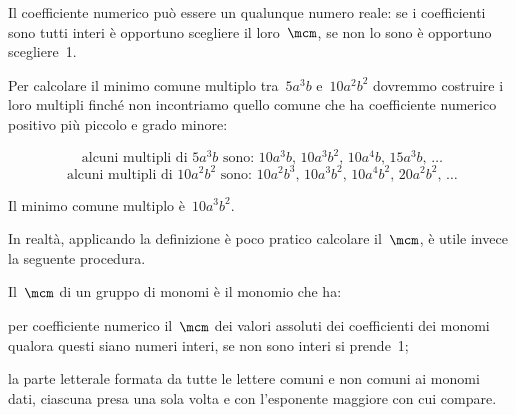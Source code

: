 Il coefficiente numerico può essere un qualunque numero reale: se i
coefficienti sono tutti interi è opportuno scegliere il loro~$\mcm$,
se non lo sono è opportuno scegliere~1.

\begin{exrig}
 \begin{esempio}
Per calcolare il minimo comune multiplo tra~$5a^{3}b$ e~$10a^{2}b^{2}$ dovremmo costruire i loro multipli finché non
incontriamo quello comune che ha coefficiente numerico positivo più
piccolo e grado minore:

\[\text{ alcuni multipli di }5a^{3}b\text{ sono: }10a^{3}b\text{,~}10a^{3}b^{2}\text{,~}10a^{4}b\text{,~}15a^{3}b\text{,~}\ldots\]
\[\text{ alcuni multipli di }10a^{2}b^{2}\text{ sono: }10a^{2}b^{3}\text{,~}10a^{3}b^{2}\text{,~}10a^{4}b^{2}\text{,~}20a^{2}b^{2}\text{,~}\ldots\]

Il minimo comune multiplo è~$10a^{3}b^{2}$.
 \end{esempio}
\end{exrig}

In realtà, applicando la definizione è poco pratico calcolare il~$\mcm$, è utile invece la seguente procedura.

\begin{procedura}
Il~$\mcm$ di un gruppo di monomi è il monomio che ha:

\begin{enumeratea}
 \item per coefficiente numerico il~$\mcm$ dei valori assoluti dei
coefficienti dei monomi qualora
questi siano numeri interi, se non sono interi si prende~1;
 \item la parte letterale formata da tutte le lettere comuni e non comuni
ai monomi dati, ciascuna
presa una sola volta e con l'esponente maggiore con
cui compare.
\end{enumeratea}
\end{procedura}

